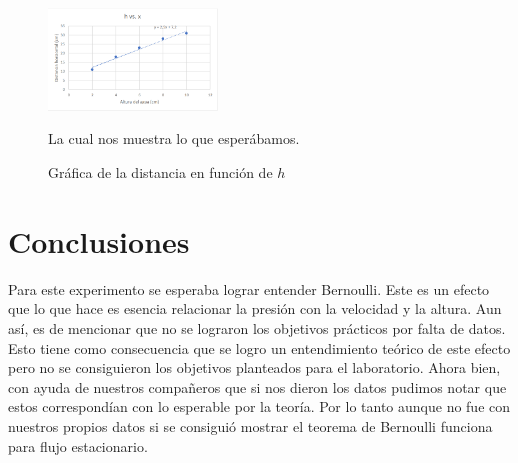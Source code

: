 \documentclass[a4paper, amsfonts, amssymb, amsmath, reprint, showkeys, nofootinbib, twoside]{revtex4-1}
\begin{document}
\begin{figure}[htpb]
  \centering
  \includegraphics[width=0.4\textwidth]{hvsx.png}
  \caption{Gráfica de la distancia en función de $h$}
  \label{fig:hvsx}

  La cual nos muestra lo que esperábamos.
\end{figure}


\section{Conclusiones}

Para este experimento se esperaba lograr entender Bernoulli. Este es un efecto que lo que hace es esencia relacionar la presión con la velocidad y la altura. Aun así, es de mencionar que no se lograron los objetivos prácticos por falta de datos. Esto tiene como consecuencia que se logro un entendimiento teórico de este efecto pero no se consiguieron los objetivos planteados para el laboratorio. Ahora bien, con ayuda de nuestros compañeros que si nos dieron los datos pudimos notar que estos correspondían con lo esperable por la teoría. Por lo tanto aunque no fue con nuestros propios datos si se consiguió mostrar el teorema de Bernoulli funciona para flujo estacionario.
\end{document}
